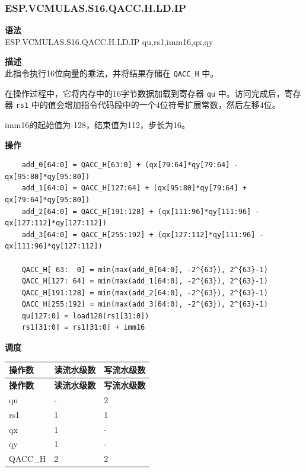 \newpage
\subsubsection{ESP.VCMULAS.S16.QACC.H.LD.IP}\label{instruction:ESPVCMULASS16QACC_HLDIP}
\textbf{语法}\\
ESP.VCMULAS.S16.QACC.H.LD.IP qu,rs1,imm16,qx,qy

\textbf{描述}\\
此指令执行16位向量的乘法，并将结果存储在 \lstinline{QACC_H} 中。

在操作过程中，它将内存中的16字节数据加载到寄存器 \lstinline{qu} 中。访问完成后，寄存器 \lstinline{rs1} 中的值会增加指令代码段中的一个4位符号扩展常数，然后左移4位。

imm16的起始值为-128，结束值为112，步长为16。

\textbf{操作}\\
\begin{lstlisting}
    add_0[64:0] = QACC_H[63:0] + (qx[79:64]*qy[79:64] - qx[95:80]*qy[95:80])
    add_1[64:0] = QACC_H[127:64] + (qx[95:80]*qy[79:64] + qx[79:64]*qy[95:80])
    add_2[64:0] = QACC_H[191:128] + (qx[111:96]*qy[111:96] - qx[127:112]*qy[127:112])
    add_3[64:0] = QACC_H[255:192] + (qx[127:112]*qy[111:96] - qx[111:96]*qy[127:112])

    QACC_H[ 63:  0] = min(max(add_0[64:0], -2^{63}), 2^{63}-1)
    QACC_H[127: 64] = min(max(add_1[64:0], -2^{63}), 2^{63}-1)
    QACC_H[191:128] = min(max(add_2[64:0], -2^{63}), 2^{63}-1)
    QACC_H[255:192] = min(max(add_3[64:0], -2^{63}), 2^{63}-1)
    qu[127:0] = load128(rs1[31:0])
    rs1[31:0] = rs1[31:0] + imm16
\end{lstlisting}

\textbf{调度}\\
\begin{longtable}[c]{|l|l|l|}
    \hline
    \rowcolor{lightgray}
    \textbf{操作数} & \textbf{读流水级数} & \textbf{写流水级数} \\\hline
    \endfirsthead
    \hline
    \rowcolor{lightgray}
     \textbf{操作数} & \textbf{读流水级数} & \textbf{写流水级数} \\\hline
    \endhead
    \hline
    \endfoot

    qu & - & 2 \\\hline
    rs1 & 1 & 1 \\\hline
     qx & 1 & - \\\hline
     qy & 1 & - \\\hline
     QACC\_H & 2 & 2

\end{longtable}


